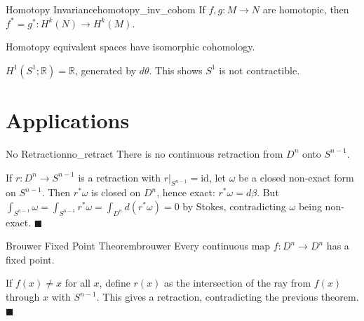 \documentclass[11pt, letterpaper, openany]{book}
\renewenvironment{proof}[1][\proofname]{%
  \tcolorbox[blanker, breakable, left=1em,
    before skip=1em, after skip=1em,
    borderline west={2pt}{0pt}{MagicTeal!50},
    colback=MagicCream,
    before upper={\textcolor{MagicTeal}{\sffamily\bfseries #1.}\space}
  ]%
}{%
  \hfill\textcolor{MagicTeal}{\ensuremath{\blacksquare}}\endtcolorbox%
}
\begin{document}
\begin{thm}{Homotopy Invariance}{homotopy_inv_cohom}
If $f, g: M \to N$ are homotopic, then $f^* = g^*: H^k(N) \to H^k(M)$.
\end{thm}

\begin{corollary}
Homotopy equivalent spaces have isomorphic cohomology.
\end{corollary}

\begin{example}
$H^1(S^1; \mathbb{R}) = \mathbb{R}$, generated by $d\theta$. This shows $S^1$ is not contractible.
\end{example}

\section{Applications}

\begin{thm}{No Retraction}{no_retract}
There is no continuous retraction from $D^n$ onto $S^{n-1}$.
\end{thm}

\begin{proof}
If $r: D^n \to S^{n-1}$ is a retraction with $r|_{S^{n-1}} = \text{id}$, let $\omega$ be a closed non-exact form on $S^{n-1}$. Then $r^*\omega$ is closed on $D^n$, hence exact: $r^*\omega = d\beta$. But $\int_{S^{n-1}} \omega = \int_{S^{n-1}} r^*\omega = \int_{D^n} d(r^*\omega) = 0$ by Stokes, contradicting $\omega$ being non-exact.
\end{proof}

\begin{thm}{Brouwer Fixed Point Theorem}{brouwer}
Every continuous map $f: D^n \to D^n$ has a fixed point.
\end{thm}

\begin{proof}
If $f(x) \neq x$ for all $x$, define $r(x)$ as the intersection of the ray from $f(x)$ through $x$ with $S^{n-1}$. This gives a retraction, contradicting the previous theorem.
\end{proof}
\end{document}
